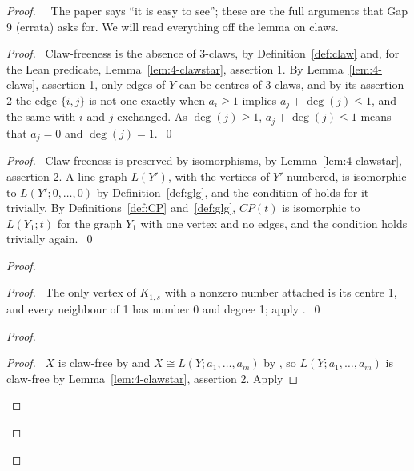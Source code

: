 \begin{proof}
 \pfsketch\ \repair\ The paper says ``it is easy to see''; these are the full arguments that
 Gap 9 (errata) asks for. We will read everything off the lemma on claws.
 \begin{proof}\pf\ Claw-freeness is the absence of 3-claws, by Definition~\ref{def:claw} and, for
  the Lean predicate, Lemma~\ref{lem:4-clawstar}, assertion 1. By Lemma~\ref{lem:4-claws},
  assertion 1, only edges of $Y$ can be centres of 3-claws, and by its assertion 2 the edge $\{i,j\}$ is not one exactly when $a_i\ge1$ implies
  $a_j+\deg(j)\le1$, and the same with $i$ and $j$ exchanged. As $\deg(j)\ge1$,
  $a_j+\deg(j)\le1$ means that $a_j=0$ and $\deg(j)=1$.~\qed\end{proof}
 \begin{proof}\pf\ Claw-freeness is preserved by isomorphisms, by
  Lemma~\ref{lem:4-clawstar}, assertion 2. A line graph $L(Y')$, with the
  vertices of $Y'$ numbered, is isomorphic to $L(Y';0,\dots,0)$ by Definition~\ref{def:glg}, and
  the condition of  holds for it trivially. By Definitions~\ref{def:CP}
  and~\ref{def:glg}, $CP(t)$ is isomorphic to $L(Y_1;t)$ for the graph $Y_1$ with one vertex and
  no edges, and the condition holds trivially again.~\qed\end{proof}
 \begin{proof}
  \begin{proof}\pf\ The only vertex of $K_{1,s}$ with a nonzero number attached is its centre 1,
   and every neighbour of 1 has number 0 and degree 1; apply .~\qed\end{proof}
  \begin{proof}
   \begin{proof}\pf\ $X$ is claw-free by  and $X\cong L(Y;a_1,\dots,a_m)$ by , so
    $L(Y;a_1,\dots,a_m)$ is claw-free by Lemma~\ref{lem:4-clawstar}, assertion 2. Apply

\end{proof}
\end{proof}
\end{proof}
\end{proof}
